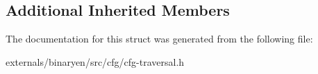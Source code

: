 \subsection*{Additional Inherited Members}


The documentation for this struct was generated from the following file\+:\begin{DoxyCompactItemize}
\item 
externals/binaryen/src/cfg/cfg-\/traversal.\+h\end{DoxyCompactItemize}
